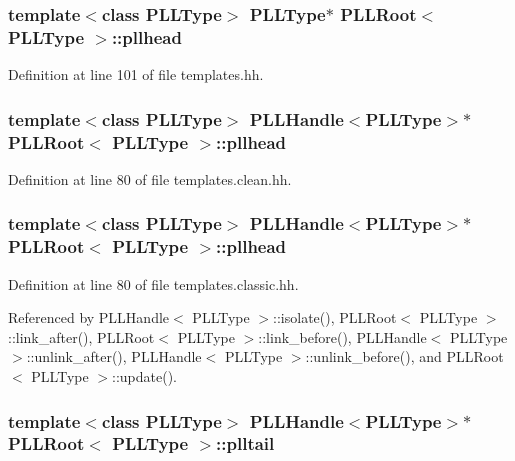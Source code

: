 \subsubsection{\setlength{\rightskip}{0pt plus 5cm}template$<$class PLLType$>$ {\bf PLLType}$\ast$ PLLRoot$<$ {\bf PLLType} $>$::pllhead\hspace{0.3cm}{\tt  [protected]}}\label{classPLLRoot_n4}




Definition at line 101 of file templates.hh.
\subsubsection{\setlength{\rightskip}{0pt plus 5cm}template$<$class PLLType$>$ {\bf PLLHandle}$<${\bf PLLType}$>$$\ast$ PLLRoot$<$ {\bf PLLType} $>$::pllhead\hspace{0.3cm}{\tt  [protected]}}\label{classPLLRoot_n2}




Definition at line 80 of file templates.clean.hh.
\subsubsection{\setlength{\rightskip}{0pt plus 5cm}template$<$class PLLType$>$ {\bf PLLHandle}$<${\bf PLLType}$>$$\ast$ PLLRoot$<$ {\bf PLLType} $>$::pllhead\hspace{0.3cm}{\tt  [protected]}}\label{classPLLRoot_n0}




Definition at line 80 of file templates.classic.hh.

Referenced by PLLHandle$<$ PLLType $>$::isolate(), PLLRoot$<$ PLLType $>$::link\_\-after(), PLLRoot$<$ PLLType $>$::link\_\-before(), PLLHandle$<$ PLLType $>$::unlink\_\-after(), PLLHandle$<$ PLLType $>$::unlink\_\-before(), and PLLRoot$<$ PLLType $>$::update().
\subsubsection{\setlength{\rightskip}{0pt plus 5cm}template$<$class PLLType$>$ {\bf PLLHandle}$<${\bf PLLType}$>$$\ast$ PLLRoot$<$ {\bf PLLType} $>$::plltail\hspace{0.3cm}{\tt  [protected]}}\label{classPLLRoot_n7}




